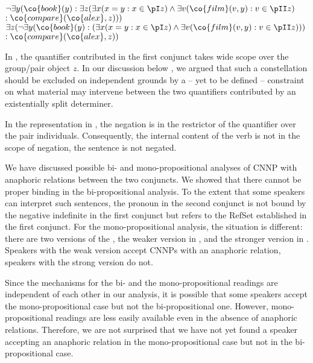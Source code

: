 \documentclass[output=paper]{langsci/langscibook}
\begin{document}
\ea
\begin{xlist}
\ex 
$\lnot \exists y (\co{book}(y) : \exists z (\exists x (x=y: x \in \pI z) \land \exists v (\co{film}(v,y) : v \in \pII z)$\\ 
\hspace*{\fill}$ : 
\co{compare}(\co{alex}, z)))$\label{NotExEx}
\ex
$\exists z (\lnot \exists y (\co{book}(y) : 
(\exists x (x=y : x \in \pI z)
\land \exists v (\co{film}(v,y) : v \in  \pII z) 
))$\\ 
\hspace*{\fill}$: \co{compare}(\co{alex},z))$\label{ExNotEx}
\end{xlist}
\z

In  , the quantifier contributed in the first conjunct takes wide scope over the group/pair object $z$. 
In our discussion below , we argued that such a constellation should be excluded on independent grounds by a -- yet to be defined -- constraint on what material may intervene between the two quantifiers contributed by  an existentially split determiner.

In the representation in , the negation is in the restrictor of the quantifier over the pair individuals.
Consequently, the internal content of the verb is not in the scope of negation, the sentence is not negated. 

\medskip%
We have discussed possible bi- and mono-propositional analyses of CNNP with anaphoric relations between the two conjuncts. 
We showed that there cannot be proper binding in the bi-propositional analysis. 
To the extent that some speakers can interpret such sentences, the pronoun in the second conjunct is not bound by the negative indefinite in the first conjunct but refers to the RefSet established in the first conjunct. 
For the mono-propositional analysis, the situation is different: there are two versions of the \CCB, the weaker version in , and the stronger version in . 
Speakers with the weak version accept CNNPs with an anaphoric relation, speakers with the strong version do not.

Since the mechanisms for the bi- and the mono-propositional readings are independent of each other in our analysis, it is possible that some speakers accept the mono-propositional case but not the bi-propositional one. 
However, mono-propositional readings are less easily available even in the absence of anaphoric relations. 
Therefore, we are not surprised that we have not yet found a speaker accepting an anaphoric relation in the mono-propositional case but not in the bi-propositional case.
\end{document}
